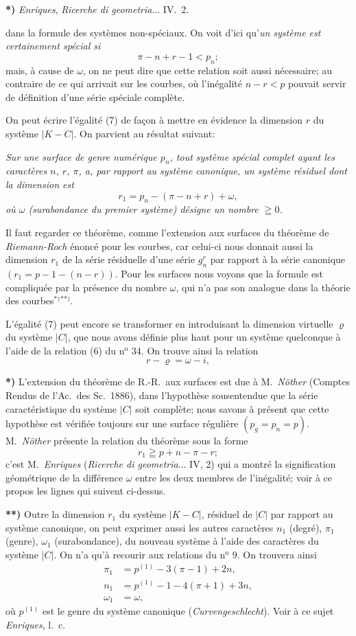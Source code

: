 \documentclass{article}
\begin{document}
\textbf{*)} \emph{Enriques}, \emph{Ricerche di geometria}... IV.\ 2.

dans la formule des systèmes non-spéciaux. On voit d'ici qu'\emph{un système est certainement spécial si}
\[ \pi - n + r - 1 < p_{n}; \]
mais, à cause de $\omega$, on ne peut dire que cette relation soit aussi nécessaire; au contraire de ce qui arrivait sur les courbes, où l'inégalité $n - r < p$ pouvait servir de définition d'une série spéciale complète.

On peut écrire l'égalité (7) de façon à mettre en évidence la dimension $r$ du système $|K-C|$. On parvient au résultat suivant:

\emph{Sur une surface de genre numérique $p_{n}$, tout système spécial complet ayant les caractères $n$, $r$, $\pi$, a, par rapport au système canonique, un système résiduel dont la dimension est}
\[ r_{1} = p_{n} - (\pi-n+r) + \omega, \tag{8} \]
\emph{où $\omega$ (surabondance du premier système) désigne un nombre $\geqq 0$.}

Il faut regarder ce théorème, comme l'extension aux surfaces du théorème de \emph{Riemann-Roch} énoncé pour les courbes, car celui-ci nous donnait aussi la dimension $r_{1}$ de la série résiduelle d'une série $g_{n}^{r}$ par rapport à la série canonique $(r_{1} = p - 1 - (n-r))$. Pour les surfaces nous voyons que la formule est compliquée par la présence du nombre $\omega$, qui n'a pas son analogue dans la théorie des courbes${}^{*)}$${}^{**)}$.

L'égalité (7) peut encore se transformer en introduisant la dimension virtuelle $\varrho$ du système $|C|$, que nous avons définie plus haut pour un système quelconque à l'aide de la relation (6) du n${}^{\text{o}}$ 34. On trouve ainsi la relation
\[ r - \varrho = \omega - i, \]

\textbf{*)} L'extension du théorème de R.-R.\ aux surfaces est due à M.\ \emph{Nöther} (Comptes Rendus de l'Ac.\ des Sc.\ 1886), dans l'hypothèse sousentendue que la série caractéristique du système $|C|$ soit complète; nous savons à présent que cette hypothèse est vérifiée toujours sur une surface régulière $(p_{g}=p_{n}=p)$. M.\ \emph{Nöther} présente la relation du théorème sous la forme
\[ r_{1} \geqq p + n - \pi - r; \]
c'est M.\ \emph{Enriques} (\emph{Ricerche di geometria}... IV, 2) qui a montré la signification géométrique de la différence $\omega$ entre les deux membres de l'inégalité; voir à ce propos les lignes qui suivent ci-dessus.

\textbf{**)} Outre la dimension $r_{1}$ du système $|K-C|$, résiduel de $|C|$ par rapport au système canonique, on peut exprimer aussi les autres caractères $n_{1}$ (degré), $\pi_{1}$ (genre), $\omega_{1}$ (surabondance), du nouveau système à l'aide des caractères du système $|C|$. On n'a qu'à recourir aux relations du n${}^{\text{o}}$ 9. On trouvera ainsi
\[ \begin{aligned} \pi_{1} &= p^{(1)} - 3(\pi-1) + 2n, \\ n_{1} &= p^{(1)} - 1 - 4(\pi+1) + 3n, \\ \omega_{1} &= \omega, \end{aligned} \]
où $p^{(1)}$ est le genre du système canonique (\emph{Curvengeschlecht}). Voir à ce sujet \emph{Enriques}, l.\ c.
\end{document}
